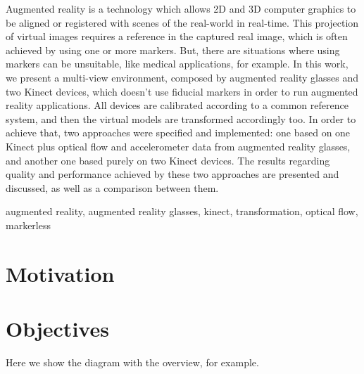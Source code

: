 \documentclass[msc, a4paper, classic, pt]{ufbathesis}
\begin{document}
\abstract
Augmented reality is a technology which allows 2D and 3D computer graphics to be aligned or registered with scenes of the real-world in real-time. This projection of virtual images requires a reference in the captured real image, which is often achieved by using one or more markers. But, there are situations where using markers can be unsuitable, like medical applications, for example. In this work, we present a multi-view environment, composed by augmented reality glasses and two Kinect devices, which doesn't use fiducial markers in order to run augmented reality applications. All devices are calibrated according to a common reference system, and then the virtual models are transformed accordingly too. In order to achieve that, two approaches were specified and implemented: one based on one Kinect plus optical flow and accelerometer data from augmented reality glasses, and another one based purely on two Kinect devices. The results regarding quality and performance achieved by these two approaches are presented and discussed, as well as a comparison between them.
\begin{keywords}
augmented reality, augmented reality glasses, kinect, transformation, optical flow, markerless
\end{keywords}

\tableofcontents

\listoffigures

\listoftables

\mainmatter

% 
% 
% 
%

\section{Motivation}
\section{Objectives}
Here we show the diagram with the overview, for example.
\end{document}
